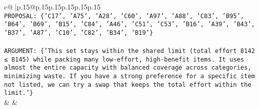 \documentclass{article}
\begin{document}
{\begin{supertabular}{c@{$\;$}|p{.15\linewidth}@{}p{.15\linewidth}p{.15\linewidth}p{.15\linewidth}p{.15\linewidth}p{.15\linewidth}}
{{{\\ 
\texttt{PROPOSAL: \{'C17', 'A75', 'A28', 'C60', 'A97', 'A88', 'C83', 'B95', 'B64', 'B69', 'B15', 'C84', 'A46', 'C51', 'C53', 'B16', 'A39', 'B43', 'B37', 'A87', 'C10', 'C82', 'B34', 'B19'\}} \\
\\ 
\texttt{ARGUMENT: \{'This set stays within the shared limit (total effort 8142 ≤ 8145) while packing many low{-}effort, high{-}benefit items. It uses almost the entire capacity with balanced coverage across categories, minimizing waste. If you have a strong preference for a specific item not listed, we can try a swap that keeps the total effort within the limit.'\}} \\
            }
        }
    }
    & & \\ \\


\end{supertabular}}
\end{document}
